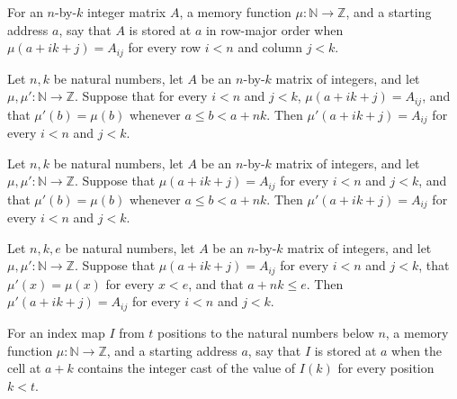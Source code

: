 \begin{definition}
\label{Light.MatAt}
\leanok
For an $n$-by-$k$ integer matrix $A$, a memory function $\mu:\mathbb{N}\to\mathbb{Z}$,
and a starting address $a$, say that $A$ is stored at $a$ in row-major order when
$\mu(a+ik+j)=A_{ij}$ for every row $i<n$ and column $j<k$.
\end{definition}

\begin{theorem}
\label{Light.MatAt.congr}
\leanok
{}
Let $n,k$ be natural numbers, let $A$ be an $n$-by-$k$ matrix of integers, and let
$\mu,\mu' : \mathbb{N} \to \mathbb{Z}$. Suppose that for every $i<n$ and $j<k$,
$\mu(a+ik+j)=A_{ij}$, and that $\mu'(b)=\mu(b)$ whenever $a\le b<a+nk$. Then
$\mu'(a+ik+j)=A_{ij}$ for every $i<n$ and $j<k$.
\end{theorem}

\begin{theorem}
\label{Light.MatAt.keep}
\leanok
{}
Let $n,k$ be natural numbers, let $A$ be an $n$-by-$k$ matrix of integers, and let
$\mu,\mu' : \mathbb{N} \to \mathbb{Z}$. Suppose that $\mu(a+ik+j)=A_{ij}$ for every
$i<n$ and $j<k$, and that $\mu'(b)=\mu(b)$ whenever $a\le b<a+nk$. Then
$\mu'(a+ik+j)=A_{ij}$ for every $i<n$ and $j<k$.
\end{theorem}

\begin{theorem}
\label{Light.MatAt.congr_below}
\leanok
{}
Let $n,k,e$ be natural numbers, let $A$ be an $n$-by-$k$ matrix of integers, and let
$\mu,\mu' : \mathbb{N} \to \mathbb{Z}$. Suppose that $\mu(a+ik+j)=A_{ij}$ for every
$i<n$ and $j<k$, that $\mu'(x)=\mu(x)$ for every $x<e$, and that $a+nk\le e$. Then
$\mu'(a+ik+j)=A_{ij}$ for every $i<n$ and $j<k$.
\end{theorem}

\begin{definition}
\label{Light.VecAt}
\leanok
For an index map $I$ from $t$ positions to the natural numbers below $n$, a memory
function $\mu:\mathbb{N}\to\mathbb{Z}$, and a starting address $a$, say that $I$ is
stored at $a$ when the cell at $a+k$ contains the integer cast of the value of $I(k)$
for every position $k<t$.
\end{definition}

